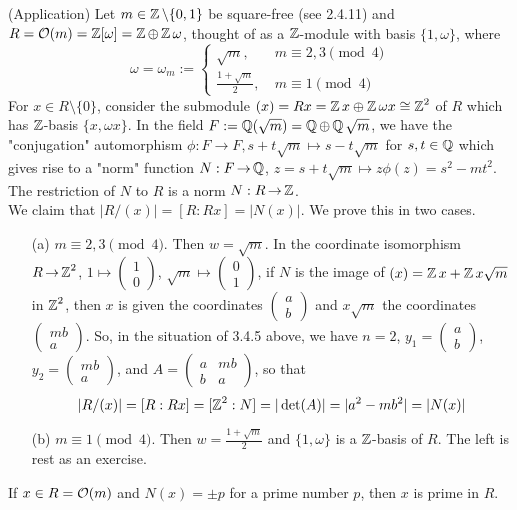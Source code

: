 \documentclass[11pt]{book}
\theoremstyle{definition}   \newtheorem{defn}[counter]{Definition} %
\newcommand{\bs}{\setminus}   \newcommand{\A}{\mathcal{A}}   \newcommand{\sy}{\textnormal{Syl}}   \newcommand{\size}[1]{\left| #1 \right|}
\newcommand{\mymatrix}[2]{\left( \begin{array}{#1} #2 \end{array} \right)}
\DeclareMathOperator{\ra}{\rightarrow}   \DeclareMathOperator{\Poly}{\mathbf{P}}   \DeclareMathOperator{\spn}{\textnormal{span}}   \DeclareMathOperator{\aut}{\textnormal{Aut}}
\newcommand{\vs}{\vspace{8pt}}   \newcommand{\hs}{\hspace{8pt}}
\numberwithin{counter}{chapter}
\begin{document}
\begin{remark}(Application)
Let $m \in \z \bs\{0,1\}$ be square-free (see 2.4.11) and $R = \mathcal{O}(m) = \operatorname{\mathbb{Z}}[\omega] = \operatorname{\mathbb{Z}} \oplus \operatorname{\mathbb{Z}}\omega$, thought of as a $\operatorname{\mathbb{Z}}$-module with basis $\{1,\omega\}$, where
	\[\omega = \omega_m := \begin{cases}
	\sqrt{m}, \quad & m \equiv 2,3 \pmod{4}\\
	\frac{1+\sqrt{m}}{2}, & m \equiv 1 \pmod{4}
	\end{cases} \]
For $x \in R\bs\{0\}$, consider the submodule $(x) = Rx = \operatorname{\mathbb{Z}} x \oplus \operatorname{\mathbb{Z}} \omega x \cong \operatorname{\mathbb{Z}}^2$ of $R$ which has $\operatorname{\mathbb{Z}}$-basis $\{x,\omega x\}$. In the field $F := \operatorname{\mathbb{Q}}(\sqrt{m}) = \operatorname{\mathbb{Q}} \oplus \operatorname{\mathbb{Q}} \sqrt{m}$, we have the "conjugation" automorphism $\phi : F \ra F, s+t \sqrt{m} \mapsto s-t\sqrt{m}$ for $s,t \in \operatorname{\mathbb{Q}}$ which gives rise to a "norm" function $N : F \ra \Q$, $z = s+t \sqrt{m} \mapsto z \phi(z) = s^2 - mt^2$. The restriction of $N$ to $R$ is a norm $N : R \ra \z$. \\

We claim that $|R/(x)| = [R : Rx] = |N(x)|$. We prove this in two cases.
\begin{enumerate}
\item[(a)] $m \equiv 2,3 \pmod{4}$. Then $w = \sqrt{m}$. In the coordinate isomorphism $R \ra \z^2$, $1 \mapsto \mymatrix{c}{1 \\ 0}$, $\sqrt{m} \mapsto \mymatrix{c}{0 \\ 1}$, if $N$ is the image of $(x) = \operatorname{\mathbb{Z}} x + \operatorname{\mathbb{Z}} x\sqrt{m}$ in $\operatorname{\mathbb{Z}}^2$, then $x$ is given the coordinates $\mymatrix{c}{a \\ b}$ and $x \sqrt{m}$ the coordinates $\mymatrix{c}{mb \\ a}$. So, in the situation of 3.4.5 above, we have $n = 2$, $y_1 = \mymatrix{c}{a \\ b}$, $y_2 = \mymatrix{c}{mb \\ a}$, and $A = \mymatrix{cc}{a & mb \\ b & a}$, so that
\[|R/(x)| = [R : Rx] = [\operatorname{\mathbb{Z}}^2 : N] = |\det(A)| = |a^2 - mb^2| = |N(x)| \]

\item[(b)] $m \equiv 1 \pmod{4}$. Then $w = \frac{1 + \sqrt{m}}{2}$ and $\{1,\omega\}$ is a $\operatorname{\mathbb{Z}}$-basis of $R$. The left is rest as an exercise.
\end{enumerate}
\end{remark}

\vs

\noindent {} If $x \in R = \mathcal{O}(m)$ and $N(x) = \pm p$ for a prime number $p$, then $x$ is prime in $R$. \\
\end{document}
